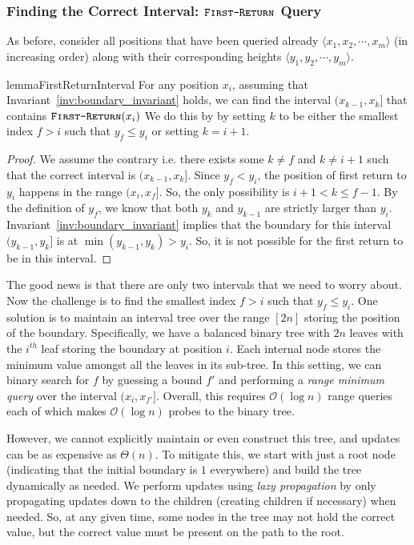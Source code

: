 \subsubsection{Finding the Correct Interval: $\texttt{\textsc{First-Return}}$ Query}
As before, consider all positions that have been queried already $ \langle x_1, x_2,\cdots, x_m \rangle$ (in increasing order)
along with their corresponding heights $ \langle y_1, y_2,\cdots, y_m \rangle$.
\begin{restatable}{lemma}{FirstReturnInterval}
\label{lem:first_return_interval}
For any position $x_i$, assuming that Invariant~\ref{inv:boundary_invariant} holds,
we can find the interval $(x_{k-1},x_{k}]$ that contains $\texttt{\textsc{First-Return}}(x_i)$
We do this by by setting $k$ to be either the smallest index $f>i$ such that $y_f\le y_i$ or setting $k=i+1$.
\end{restatable}
\begin{proof}
We assume the contrary i.e. there exists some $k\not=f$ and $k\not=i+1$ such that the correct interval is $(x_{k-1},x_k]$.
Since $y_f<y_i$, the position of first return to $y_i$ happens in the range $(x_i,x_f]$.
So, the only possibility is $i+1 < k \le f-1$.
By the definition of $y_f$, we know that both $y_k$ and $y_{k-1}$ are strictly larger than $y_i$.
Invariant~\ref{inv:boundary_invariant} implies that the boundary for this interval $(y_{k-1},y_k]$ is at $\min(y_{k-1},y_k) > y_i$.
So, it is not possible for the first return to be in this interval.
\end{proof}

The good news is that there are only two intervals that we need to worry about.
Now the challenge is to find the smallest index $f>i$ such that $y_f\le y_i$.
One solution is to maintain an interval tree  over the range $[2n]$ storing the position of the boundary.
Specifically, we have a balanced binary tree with $2n$ leaves with the $i^{th}$ leaf storing the boundary at position $i$.
Each internal node stores the minimum value amongst all the leaves in its sub-tree.
In this setting, we can binary search for $f$ by guessing a bound $f'$ and performing a \emph{range minimum query} over the interval $(x_i,x_{f'}]$.
Overall, this requires $\mathcal O(\log n)$ range queries each of which makes $\mathcal O(\log n)$ probes to the binary tree.

However, we cannot explicitly maintain or even construct this tree, and updates can be as expensive as $\Theta(n)$.
To mitigate this, we start with just a root node (indicating that the initial boundary is $1$ everywhere) and build the tree dynamically as needed.
We perform updates using \emph{lazy propagation}  by only propagating updates down to the children (creating children if necessary) when needed.
So, at any given time, some nodes in the tree may not hold the correct value, but the correct value must be present on the path to the root.

